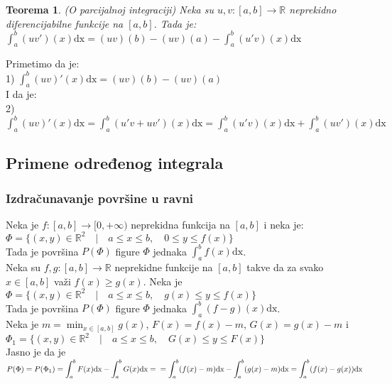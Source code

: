 \documentclass{article}
\newtheorem{teorema}{Teorema}[section]
\begin{document}
\begin{teoremabox}
    \begin{teorema}
        (O parcijalnoj integraciji) Neka su $u, v: [a, b] \rightarrow\mathbb{R}$ neprekidno diferencijabilne funkcije na $[a,b]$. Tada je:\\
        $\displaystyle\int^b_a(uv')(x)\text{dx} = (uv)(b) - (uv)(a) - \int^b_a(u'v)(x)\text{dx}$
    \end{teorema}
\end{teoremabox}
Primetimo da je:\\
1) $\displaystyle\int^b_a (uv)'(x)\text{dx} = (uv)(b) - (uv)(a)$\\
I da je:\\
2) $\displaystyle\int^b_a (uv)'(x)\text{dx} = \int^b_a(u'v + uv')(x)\text{dx} = \int^b_a(u'v)(x)\text{dx} + \int^b_a(uv')(x)\text{dx}$
\subsection{Primene određenog integrala}
\subsubsection{Izdračunavanje površine u ravni}
Neka je $f:[a, b] \rightarrow[0,+\infty)$ neprekidna funkcija na $[a,b]$ i neka je:\\
$\Phi = \{(x,y)\in\mathbb{R}^2\quad|\quad a\leq x\leq b,\quad 0\leq y\leq f(x)\}$\\
Tada je površina $P(\Phi)$ figure $\Phi$ jednaka $\displaystyle\int^b_a f(x)\text{dx}$.\\
Neka su $f,g:[a,b]\rightarrow\mathbb{R}$ neprekidne funkcije na $[a,b]$ takve da za svako $x\in[a,b]$ važi $f(x) \geq g(x)$. Neka je $\Phi = \{(x,y)\in\mathbb{R}^2\quad|\quad a\leq x\leq b,\quad g(x)\leq y\leq f(x)\}$\\
Tada je površina $P(\Phi)$ figure $\Phi$ jednaka $\displaystyle\int^b_a (f-g)(x)\text{dx}$.\\
Neka je $\displaystyle m = \min_{x\in[a,b]} g(x)$, $F(x) = f(x) - m$, $G(x) = g(x) - m$ i\\
$\Phi_1 = \{(x,y)\in\mathbb{R}^2\quad|\quad a\leq x\leq b,\quad G(x)\leq y\leq F(x)\}$\\
Jasno je da je $P(\Phi) = P(\Phi_1) = \displaystyle\int^b_aF(x)\text{dx} - \int^b_aG(x)\text{dx} =\\= \int^b_a (f(x)-m)\text{dx}-\int^b_a(g(x)-m)\text{dx} = \int^b_a(f(x)-g(x))\text{dx}$\\
\end{document}
